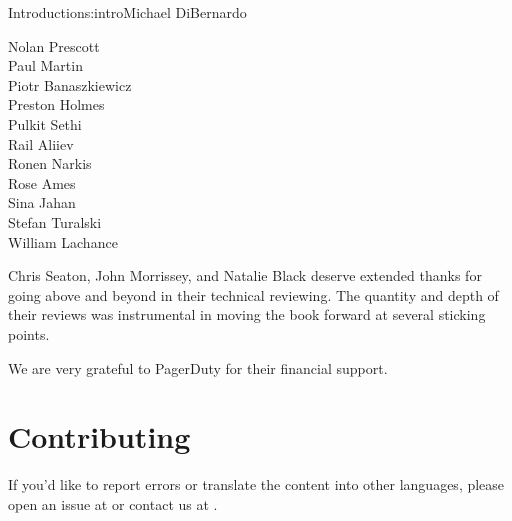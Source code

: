 \begin{aosachapter}{Introduction}{s:intro}{Michael DiBernardo}
\begin{multicols}{3}
Nolan Prescott \\
Paul Martin \\
Piotr Banaszkiewicz \\
Preston Holmes \\
Pulkit Sethi \\
Rail Aliiev \\
Ronen Narkis \\
Rose Ames \\
Sina Jahan \\
Stefan Turalski \\
William Lachance \\
\end{multicols}

\noindent Chris Seaton, John Morrissey, and Natalie Black deserve extended thanks for going above and beyond in their technical reviewing. The quantity and depth of their reviews was instrumental in moving the book forward at several sticking points.

We are very grateful to PagerDuty for their financial support. 

\section*{Contributing}

If you'd like to report errors or translate the content into other languages,
please open an issue at  or contact us at
.

\end{aosachapter}

